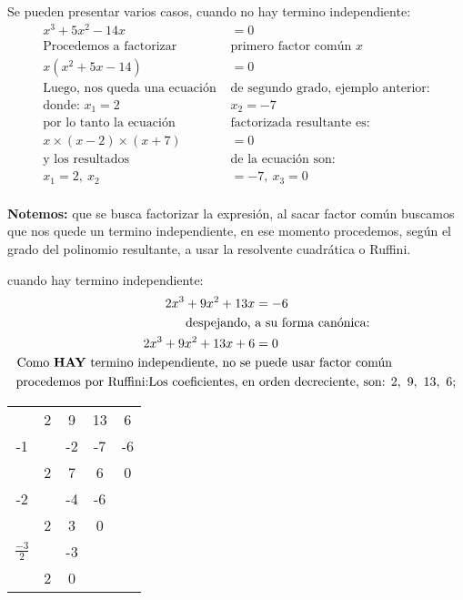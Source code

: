     Se pueden presentar varios casos, cuando no hay termino independiente:
    \begin{align*}
        x^3 + 5x^2 -14x &=0 		\\
        \text{Procedemos a factorizar} &\text{primero factor común }x \\
        x(x^2 + 5x -14)&=0\\
        \text{Luego, nos queda una ecuación }& \text{de segundo grado, ejemplo anterior:}\\
        \text{donde: }  x_1 = 2 &  x_2 = -7\\
        \text{por lo tanto la ecuación} & \text{factorizada resultante es:}\\
        x\times(x-2)\times(x+7)&= 0\\
        \text{y los resultados}& \text{de la ecuación son: } \\
        x_1= 2,\ x_2&=-7,\ x_3=0\\
    \end{align*}

    \textbf{Notemos:} que se busca factorizar la expresión, al sacar factor común
    buscamos que nos quede un termino independiente, en ese momento procedemos,
    según el grado del polinomio resultante, a usar la resolvente cuadrática o
    Ruffini.

    cuando hay termino independiente:
    \begin{align*}
        2x^3+9x^2+13x &= -6\\
        \text{despejando, }& \text{a su forma canónica:}   \\
        2x^3+9x^2+13x+6 &= 0\\
        \text{Como \textbf{HAY} termino independiente, no se }& \text{puede usar factor común} \\
        \text{procedemos por Ruffini:Los coeficientes, en}& \text{ orden decreciente, son: } 2,\ 9,\ 13,\ 6;
    \end{align*}

\begin{center}
     \begin{tabular}{c|cccc}
            &  2&  9&  13&  6\\
        -1  &   & -2&  -7& -6\\\hline
            &  2&  7&   6&  0\\
        -2  &   & -4&  -6\\\hline
            &  2&  3&   0\\
$\frac{-3}{2}$&   & -3&  \\\hline
            & 2 & 0
    \end{tabular}
\end{center}

